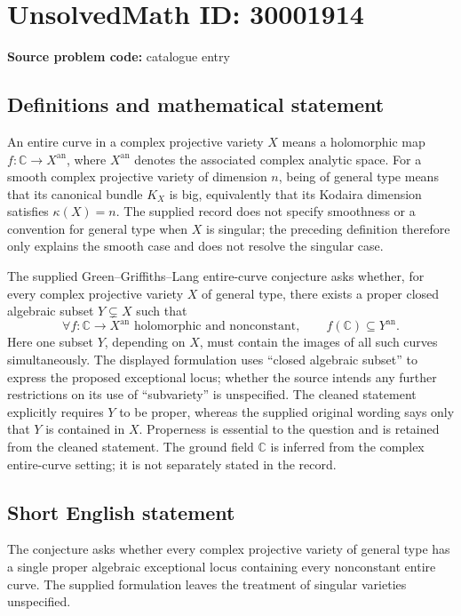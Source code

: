 \documentclass[11pt]{article}
\newcommand{\C}{\mathbb{C}}
\begin{document}
\section*{UnsolvedMath ID: 30001914}
\textbf{Source problem code:} catalogue entry
\subsection{Definitions and mathematical statement}
An entire curve in a complex projective variety \(X\) means a holomorphic map \(f\colon\C\to X^{\mathrm{an}}\), where \(X^{\mathrm{an}}\) denotes the associated complex analytic space. For a smooth complex projective variety of dimension \(n\), being of general type means that its canonical bundle \(K_X\) is big, equivalently that its Kodaira dimension satisfies \(\kappa(X)=n\). The supplied record does not specify smoothness or a convention for general type when \(X\) is singular; the preceding definition therefore only explains the smooth case and does not resolve the singular case.

The supplied Green--Griffiths--Lang entire-curve conjecture asks whether, for every complex projective variety \(X\) of general type, there exists a proper closed algebraic subset \(Y\subsetneq X\) such that
\[
  \forall f\colon\C\to X^{\mathrm{an}}\text{ holomorphic and nonconstant},
  \qquad f(\C)\subseteq Y^{\mathrm{an}}.
\]
Here one subset \(Y\), depending on \(X\), must contain the images of all such curves simultaneously. The displayed formulation uses ``closed algebraic subset'' to express the proposed exceptional locus; whether the source intends any further restrictions on its use of ``subvariety'' is unspecified. The cleaned statement explicitly requires \(Y\) to be proper, whereas the supplied original wording says only that \(Y\) is contained in \(X\). Properness is essential to the question and is retained from the cleaned statement. The ground field \(\C\) is inferred from the complex entire-curve setting; it is not separately stated in the record.
\subsection{Short English statement}
The conjecture asks whether every complex projective variety of general type has a single proper algebraic exceptional locus containing every nonconstant entire curve. The supplied formulation leaves the treatment of singular varieties unspecified.
\end{document}
